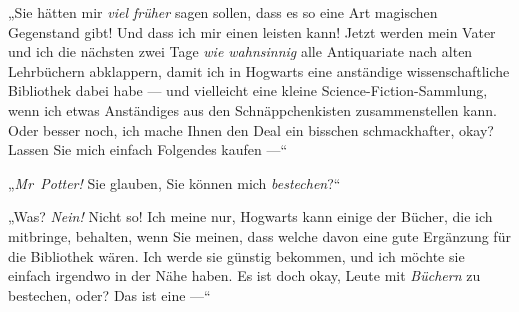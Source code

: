„Sie hätten mir \emph{viel früher} sagen sollen, dass es so eine Art magischen Gegenstand gibt! Und dass ich mir einen leisten kann! Jetzt werden mein Vater und ich die nächsten zwei Tage \emph{wie wahnsinnig} alle Antiquariate nach alten Lehrbüchern abklappern, damit ich in Hogwarts eine anständige wissenschaftliche Bibliothek dabei habe — und vielleicht eine kleine Science-Fiction-Sammlung, wenn ich etwas Anständiges aus den Schnäppchenkisten zusammenstellen kann. Oder besser noch, ich mache Ihnen den Deal ein bisschen schmackhafter, okay? Lassen Sie mich einfach Folgendes kaufen —“

„\emph{Mr~Potter!} Sie glauben, Sie können mich \emph{bestechen}?“

„Was? \emph{Nein!} Nicht so! Ich meine nur, Hogwarts kann einige der Bücher, die ich mitbringe, behalten, wenn Sie meinen, dass welche davon eine gute Ergänzung für die Bibliothek wären. Ich werde sie günstig bekommen, und ich möchte sie einfach irgendwo in der Nähe haben. Es ist doch okay, Leute mit \emph{Büchern} zu bestechen, oder? Das ist eine —“

